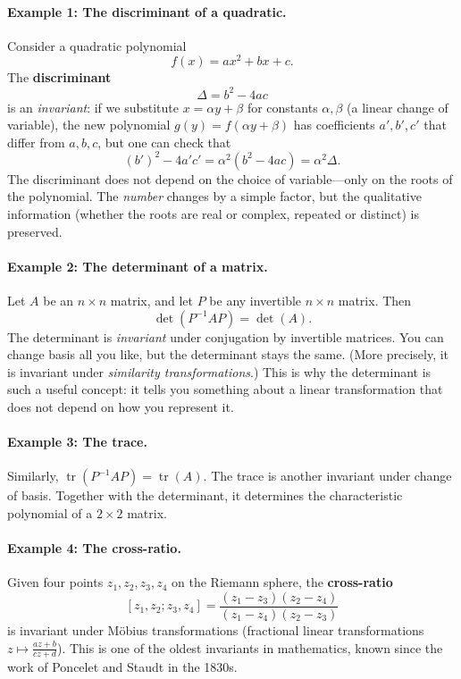 \paragraph{Example 1: The discriminant of a quadratic.}
Consider a quadratic polynomial
\[
    f(x) = ax^2 + bx + c.
\]
The \textbf{discriminant}
\[
    \Delta = b^2 - 4ac
\]
is an \emph{invariant}: if we substitute $x = \alpha y + \beta$ for constants $\alpha, \beta$ (a linear change of variable), the new polynomial $g(y) = f(\alpha y + \beta)$ has coefficients $a', b', c'$ that differ from $a, b, c$, but one can check that
\[
    (b')^2 - 4a'c' = \alpha^2(b^2 - 4ac) = \alpha^2 \Delta.
\]
The discriminant does not depend on the choice of variable---only on the roots of the polynomial. The \emph{number} changes by a simple factor, but the qualitative information (whether the roots are real or complex, repeated or distinct) is preserved.

\paragraph{Example 2: The determinant of a matrix.}
Let $A$ be an $n \times n$ matrix, and let $P$ be any invertible $n \times n$ matrix. Then
\[
    \det(P^{-1}AP) = \det(A).
\]
The determinant is \emph{invariant} under conjugation by invertible matrices. You can change basis all you like, but the determinant stays the same. (More precisely, it is invariant under \emph{similarity transformations}.) This is why the determinant is such a useful concept: it tells you something about a linear transformation that does not depend on how you represent it.

\paragraph{Example 3: The trace.}
Similarly, $\operatorname{tr}(P^{-1}AP) = \operatorname{tr}(A)$. The trace is another invariant under change of basis. Together with the determinant, it determines the characteristic polynomial of a $2 \times 2$ matrix.

\paragraph{Example 4: The cross-ratio.}
Given four points $z_1, z_2, z_3, z_4$ on the Riemann sphere, the \textbf{cross-ratio}
\[
    [z_1, z_2; z_3, z_4] = \frac{(z_1 - z_3)(z_2 - z_4)}{(z_1 - z_4)(z_2 - z_3)}
\]
is invariant under M\"obius transformations (fractional linear transformations $z \mapsto \frac{az+b}{cz+d}$). This is one of the oldest invariants in mathematics, known since the work of Poncelet and Staudt in the 1830s.

